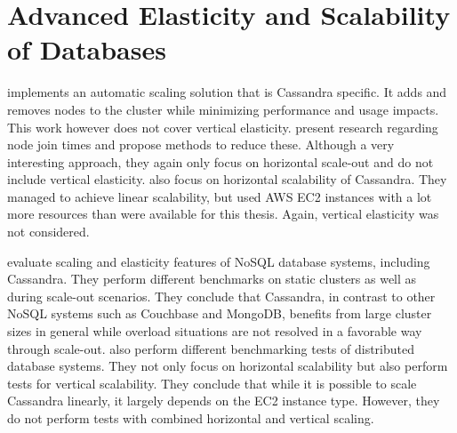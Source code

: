\section{Advanced Elasticity and Scalability of Databases}

\citeauthor{baakindAutomaticScalingCassandra2013} \cite{baakindAutomaticScalingCassandra2013} implements an automatic scaling solution that is Cassandra specific. It adds and removes nodes to the cluster while minimizing performance and usage impacts. This work however does not cover vertical elasticity. \citeauthor{miyokawaElasticityImprovementCassandra2016a} \cite{miyokawaElasticityImprovementCassandra2016a} present research regarding node join times and propose methods to reduce these. Although a very interesting approach, they again only focus on horizontal scale-out and do not include vertical elasticity. \citeauthor{cockroftBenchmarkingCassandraScalability2011} \cite{cockroftBenchmarkingCassandraScalability2011} also focus on horizontal scalability of Cassandra. They managed to achieve linear scalability, but used AWS EC2 instances with a lot more resources than were available for this thesis. Again, vertical elasticity was not considered.

\citeauthor{seyboldElasticityScalableDatabases2016} \cite{seyboldElasticityScalableDatabases2016} evaluate scaling and elasticity features of NoSQL database systems, including Cassandra. They perform different benchmarks on static clusters as well as during scale-out scenarios. They conclude that Cassandra, in contrast to other NoSQL systems such as Couchbase and MongoDB, benefits from large cluster sizes in general while overload situations are not resolved in a favorable way through scale-out. \citeauthor{kuhlenkampBenchmarkingScalabilityElasticity2014} \cite{kuhlenkampBenchmarkingScalabilityElasticity2014} also perform different benchmarking tests of distributed database systems. They not only focus on horizontal scalability but also perform tests for vertical scalability. They conclude that while it is possible to scale Cassandra linearly, it largely depends on the EC2 instance type. However, they do not perform tests with combined horizontal and vertical scaling.
